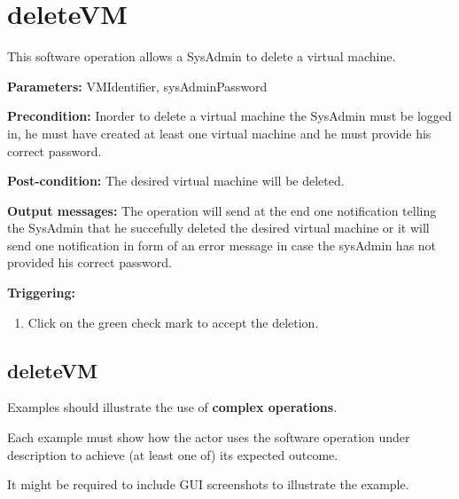 \section{deleteVM}
\label{operation:deleteVM}
This software operation allows a SysAdmin to delete a virtual machine. 
\begin{description}

\item \textbf{Parameters:} VMIdentifier, sysAdminPassword
\item \textbf{Precondition:} Inorder to delete a virtual machine the SysAdmin
must be logged in, he must have created at least one virtual machine and he must
provide his correct password.
\item \textbf{Post-condition:} The desired virtual machine will be deleted.
\item \textbf{Output messages:} The operation will send at the end one
notification telling the SysAdmin that he succefully deleted the desired
virtual machine or it will send one notification in form of an error message in
case the sysAdmin has not provided his correct password.

\item \textbf{Triggering:}
\begin{enumerate}
\item Click on the green check mark to accept the deletion.
\end{enumerate}

 
\end{description}

 
\subsection{deleteVM}
Examples should illustrate the use of \textbf{complex operations}.

Each example must show how the actor uses the software operation under
description to achieve (at least one of) its expected outcome.

It might be required to include GUI screenshots to illustrate the example.











